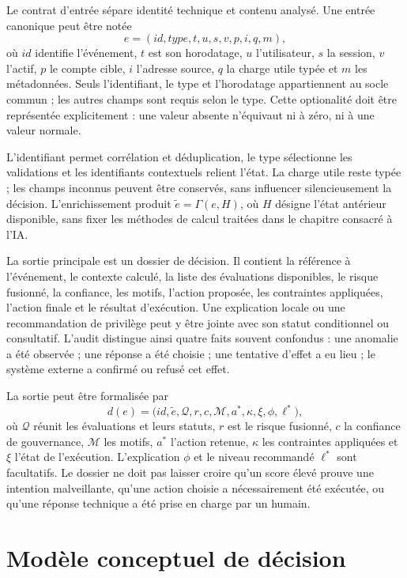 \documentclass[11pt,a4paper,oneside]{report}
\theoremstyle{definition}
\theoremstyle{plain}
\begin{document}
Le contrat d'entrée sépare identité technique et contenu analysé. Une entrée
canonique peut être notée
\[
e=(\mathit{id},\mathit{type},t,u,s,v,p,i,q,m),
\]
où \(\mathit{id}\) identifie l'événement, \(t\) est son horodatage, \(u\)
l'utilisateur, \(s\) la session, \(v\) l'actif, \(p\) le compte cible, \(i\)
l'adresse source, \(q\) la charge utile typée et \(m\) les métadonnées. Seuls
l'identifiant, le type et l'horodatage appartiennent au socle commun ; les
autres champs sont requis selon le type. Cette optionalité doit être
représentée explicitement : une valeur absente n'équivaut ni à zéro, ni à une
valeur normale.

L'identifiant permet corrélation et déduplication, le type sélectionne les
validations et les identifiants contextuels relient l'état. La charge utile
reste typée ; les champs inconnus peuvent être conservés, sans influencer
silencieusement la décision. L'enrichissement produit
\(\tilde e=\Gamma(e,H)\), où \(H\) désigne l'état antérieur disponible, sans
fixer les méthodes de calcul traitées dans le chapitre consacré à l'IA.

La sortie principale est un dossier de décision. Il contient la référence à
l'événement, le contexte calculé, la liste des évaluations disponibles, le
risque fusionné, la confiance, les motifs, l'action proposée, les contraintes
appliquées, l'action finale et le résultat d'exécution. Une explication locale
ou une recommandation de privilège peut y être jointe avec son statut
conditionnel ou consultatif. L'audit distingue ainsi quatre faits souvent
confondus : une anomalie a été observée ; une réponse a été choisie ; une
tentative d'effet a eu lieu ; le système externe a confirmé ou refusé cet
effet.

La sortie peut être formalisée par
\[
d(e)=\bigl(\mathit{id},\tilde e,\mathcal{Q},r,c,\mathcal{M},
           a^*,\kappa,\xi,\phi,\ell^*\bigr),
\]
où \(\mathcal{Q}\) réunit les évaluations et leurs statuts, \(r\) est le risque
fusionné, \(c\) la confiance de gouvernance, \(\mathcal{M}\) les motifs,
\(a^*\) l'action retenue, \(\kappa\) les contraintes appliquées et \(\xi\)
l'état de l'exécution. L'explication \(\phi\) et le niveau recommandé
\(\ell^*\) sont facultatifs. Le dossier ne doit pas laisser croire qu'un score
élevé prouve une intention malveillante, qu'une action choisie a nécessairement
été exécutée, ou qu'une réponse technique a été prise en charge par un humain.

\section{Modèle conceptuel de décision}
\label{sec:method-formal}
\end{document}
